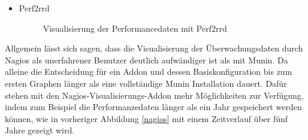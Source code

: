 \begin{itemize}
\item Perf2rrd

\begin{figure}[ht]
	\centering
		\caption{Visualisierung der Performancedaten mit Perf2rrd}
		\label{perf2rdd}
\end{figure}
\end{itemize}

Allgemein lässt sich sagen, dass die Visualisierung der Überwachungsdaten durch Nagios als unerfahrener Benutzer deutlich aufwändiger ist als mit Munin.
Da alleine die Entscheidung für ein Addon und dessen Basiskonfiguration bis zum ersten Graphen länger als eine vollständige Munin Installation dauert.
Dafür stehen mit den Nagios-Visualisierungs-Addon mehr Möglichkeiten zur Verfügung, indem zum Beispiel die Performanzedaten länger als ein Jahr gespeichert werden können, wie in vorheriger Abbildung \ref{nagios} mit einem Zeitverlauf über fünf Jahre gezeigt wird.

